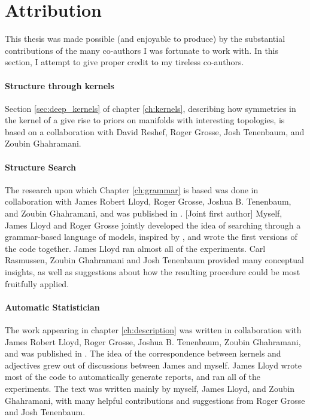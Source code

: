 \section{Attribution}

This thesis was made possible (and enjoyable to produce) by the substantial contributions of the many co-authors I was fortunate to work with.
In this section, I %
attempt to give proper credit to my tireless co-authors.

\paragraph{Structure through kernels}
Section \ref{sec:deep_kernels} of chapter \ref{ch:kernels}, describing how symmetries in the kernel of a \gplvm{} give rise to priors on manifolds with interesting topologies, is based on a collaboration with David Reshef, Roger Grosse, Josh Tenenbaum, and Zoubin Ghahramani.

\paragraph{Structure Search}
The research upon which Chapter \ref{ch:grammar} is based was done in collaboration with James Robert Lloyd, Roger Grosse, Joshua B. Tenenbaum, and Zoubin Ghahramani, and was published in \citep{DuvLloGroetal13}.
[Joint first author]
Myself, James Lloyd and Roger Grosse jointly developed the idea of searching through a grammar-based language of \gp{} models, inspired by \citet{grosse2012exploiting}, and wrote the first versions of the code together.
James Lloyd ran almost all of the experiments.
 Carl Rasmussen, Zoubin Ghahramani and Josh Tenenbaum provided many conceptual insights, as well as suggestions about how the resulting procedure could be most fruitfully applied.

\paragraph{Automatic Statistician} The work appearing in chapter \ref{ch:description} was written in collaboration with James Robert Lloyd, Roger Grosse, Joshua B. Tenenbaum, Zoubin Ghahramani, and was published in \citep{LloDuvGroetal14}.
The idea of the correspondence between kernels and adjectives grew out of discussions between James and myself.
James Lloyd wrote most of the code to automatically generate reports, and ran all of the experiments.
The text was written mainly by myself, James Lloyd, and Zoubin Ghahramani, with many helpful contributions and suggestions from Roger Grosse and Josh Tenenbaum.

